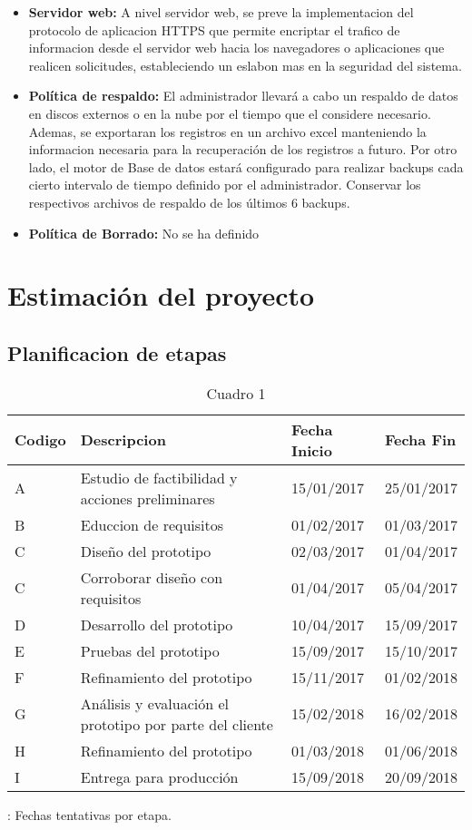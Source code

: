 \begin{itemize}
        \item \textbf{Servidor web:} A nivel servidor web, se preve la implementacion del protocolo de aplicacion HTTPS que permite encriptar el trafico de informacion desde el servidor web hacia los navegadores o aplicaciones que realicen solicitudes, estableciendo un eslabon mas en la seguridad del sistema.
        \item \textbf{Política de respaldo:} El administrador llevará a cabo un respaldo de datos en discos externos o en la nube por el tiempo que el considere necesario. Ademas, se exportaran los registros en un archivo excel manteniendo la informacion necesaria para la recuperación de los registros a futuro.
        Por otro lado, el motor de Base de datos estará configurado para realizar backups cada cierto intervalo de tiempo definido por el administrador. Conservar los respectivos archivos de respaldo de los últimos 6 backups.
        \item \textbf{Política de Borrado:} No se ha definido
      \end{itemize}
      
  \section{Estimación del proyecto}
    \subsection{Planificacion de etapas} 
      \begin{table}[H]
        \begin{tabular}{|l|l|l|l|}
          \hline
          \centering
          Codigo  & Descripcion  & Fecha Inicio & Fecha Fin \\ \hline
          A       & Estudio de factibilidad y acciones preliminares & 15/01/2017 & 25/01/2017 \\ \hline
          B       & Educcion de requisitos & 01/02/2017 & 01/03/2017 \\ \hline
          C       & Diseño del prototipo & 02/03/2017 & 01/04/2017 \\ \hline
          C       & Corroborar diseño con requisitos & 01/04/2017 & 05/04/2017 \\ \hline
          D       & Desarrollo del prototipo & 10/04/2017 & 15/09/2017\\ \hline
          E       & Pruebas del prototipo & 15/09/2017 & 15/10/2017 \\ \hline
          F       & Refinamiento del prototipo & 15/11/2017 & 01/02/2018 \\ \hline
          G       & Análisis y evaluación el prototipo por parte del cliente & 15/02/2018 & 16/02/2018 \\ \hline
          H       & Refinamiento del prototipo & 01/03/2018 & 01/06/2018 \\ \hline
          I       & Entrega para producción & 15/09/2018 & 20/09/2018 \\ \hline
        \end{tabular}
        \caption{Cuadro 1}: Fechas tentativas por etapa.
      \end{table}